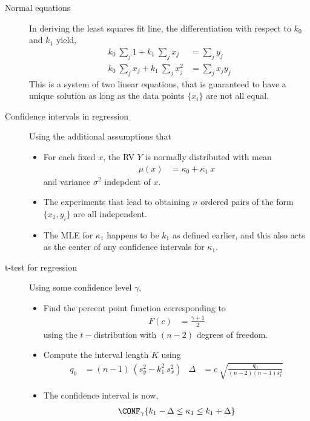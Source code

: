 \begin{description}
    \item[Normal equations] In deriving the least squares fit line, the differentiation
          with respect to $ k_0 $ and $ k_1 $ yield,
          \begin{align}
              k_0\ \sum_j 1 + k_1\ \sum_j x_j     & = \sum_j y_j     \\
              k_0\ \sum_j x_j + k_1\ \sum_j x^2_j & = \sum_j x_j y_j
          \end{align}
          This is a system of two linear equations, that is guaranteed to have a unique
          solution as long as the data points $ \{x_i\} $ are not all equal.

    \item[Confidence intervals in regression] Using the additional assumptions that
          \begin{itemize}
              \item For each fixed $ x $, the RV $ Y $ is normally distributed with mean
                    \begin{align}
                        \mu(x) & = \kappa_0 + \kappa_1\ x
                    \end{align}
                    and variance $ \sigma^2 $ indepdent of $ x $.
              \item The experiments that lead to obtaining $ n $ ordered pairs of the
                    form $ \{x_1, y_i\}$ are all independent. \par
              \item The MLE for $ \kappa_1 $ happens to be $ k_1 $ as defined earlier,
                    and this also acts as the center of any confidence intervals for
                    $ \kappa_1 $.
          \end{itemize}

    \item[t-test for regression] Using some confidence level $ \gamma $,
          \begin{itemize}
              \item Find the percent point function corresponding to
                    \begin{align}
                        F(c) & = \frac{\gamma + 1}{2}
                    \end{align}
                    using the $ t -$distribution with $ (n-2) $ degrees of freedom.
              \item Compute the interval length $ K $ using
                    \begin{align}
                        q_0    & = (n-1)\ (s_y^2 - k_1^2\ s_x^2)         &
                        \Delta & = c\ \sqrt{\frac{q_0}{(n-2)(n-1)s_x^2}}
                    \end{align}
              \item The confidence interval is now,
                    \begin{align}
                        \CONF_\gamma\{k_1 - \Delta \leq \kappa_1 \leq k_1 + \Delta\}
                    \end{align}
          \end{itemize}


\end{description}
